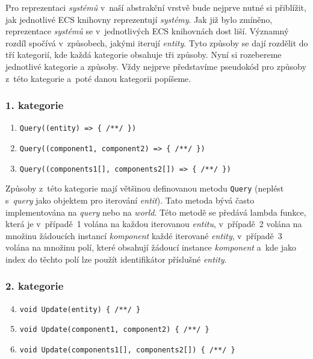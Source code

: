 Pro reprezentaci \textit{systémů} v~naší abstrakční vrstvě bude nejprve nutné si přiblížit, jak jednotlivé ECS knihovny reprezentují \textit{systémy}. Jak již bylo zmíněno, reprezentace \textit{systémů} se v~jednotlivých ECS knihovnách dost liší. Významný rozdíl spočívá v~způsobech, jakými iterují \textit{entity}. Tyto způsoby se dají rozdělit do tří kategorií, kde každá kategorie obsahuje tři způsoby. Nyní si rozebereme jednotlivé kategorie a způsoby. Vždy nejprve představíme pseudokód pro způsoby z~této kategorie a~poté danou kategorii popíšeme.

\subsubsection{1. kategorie}

\begin{enumerate}
    \item \verb|Query((entity) => { /**/ })|
    \item \verb|Query((component1, component2) => { /**/ })|
    \item \verb|Query((components1[], components2[]) => { /**/ })|
\end{enumerate}

Způsoby z~této kategorie mají většinou definovanou metodu \verb|Query| (neplést s~\textit{query} jako objektem pro iterování \textit{entit}). Tato metoda bývá často implementována na \textit{query} nebo na \textit{world}. Této metodě se předává lambda funkce, která je v~případě~1 volána na každou iterovanou \textit{entitu}, v~případě~2 volána na množinu žádoucích instancí \textit{komponent} každé iterované \textit{entity}, v~případě~3 volána na množinu polí, které obsahují žádoucí instance \textit{komponent} a~kde jako index do těchto polí lze použít identifikátor příslušné \textit{entity}.

\subsubsection{2. kategorie}

\begin{enumerate}
    \setcounter{enumi}{3}
    \item \verb|void Update(entity) { /**/ }|
    \item \verb|void Update(component1, component2) { /**/ }|
    \item \verb|void Update(components1[], components2[]) { /**/ }|
\end{enumerate}

